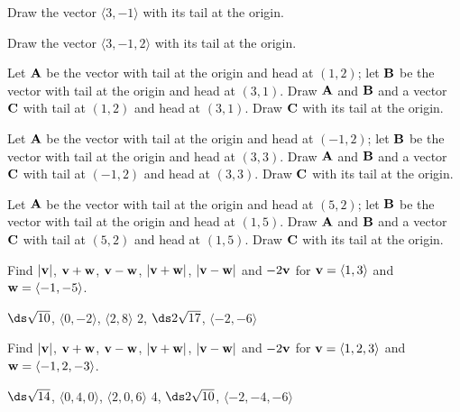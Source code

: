 \begin{enumialphparenastyle}

\begin{ex}
Draw the vector $\langle 3,-1\rangle$ with its tail at the
origin. 
\end{ex}

\begin{ex}
Draw the vector $\langle 3,-1,2\rangle$ with its tail at the
origin. 
\end{ex}

\begin{ex}
Let ${\bf A}$ be the vector with tail at the origin and head
at $(1,2)$; let ${\bf B}$ be the vector with tail at the origin and head
at $(3,1)$. Draw ${\bf A}$ and ${\bf B}$ and a vector ${\bf C}$ with 
tail at $(1,2)$ and head at $(3,1)$. Draw $\bf C$ with its tail at the origin.
\end{ex}

\begin{ex}
Let ${\bf A}$ be the vector with tail at the origin and head
at $(-1,2)$; let ${\bf B}$ be the vector with tail at the origin and head
at $(3,3)$. Draw ${\bf A}$ and ${\bf B}$ and a vector ${\bf C}$ with 
tail at $(-1,2)$ and head at $(3,3)$. Draw $\bf C$ with its tail at the origin.
\end{ex}

\begin{ex}
Let ${\bf A}$ be the vector with tail at the origin and head
at $(5,2)$; let ${\bf B}$ be the vector with tail at the origin and head
at $(1,5)$. Draw ${\bf A}$ and ${\bf B}$ and a vector ${\bf C}$ with 
tail at $(5,2)$ and head at $(1,5)$. Draw $\bf C$ with its tail at the origin.
\end{ex}

\begin{ex}
Find $|{\bf v}|$, ${\bf v}+{\bf w}$, ${\bf v}-{\bf w}$,
$|{\bf v}+{\bf w}|$, $|{\bf v}-{\bf w}|$ and $-2{\bf v}$ for
${\bf v} = \langle 1,3\rangle$ and ${\bf w} = \langle -1,-5\rangle$.
\begin{sol}
$\ds \sqrt{10}$, $\langle 0,-2\rangle$, $\langle 2,8\rangle$
2, $\ds 2\sqrt{17}$, $\langle -2,-6\rangle$
\end{sol}
\end{ex}

\begin{ex}
Find $|{\bf v}|$, ${\bf v}+{\bf w}$, ${\bf v}-{\bf w}$,
$|{\bf v}+{\bf w}|$, $|{\bf v}-{\bf w}|$ and $-2{\bf v}$ for
${\bf v} = \langle 1,2,3\rangle$ and ${\bf w} = \langle -1,2,-3\rangle$.
\begin{sol}
$\ds \sqrt{14}$, $\langle 0,4,0\rangle$, $\langle 2,0,6\rangle$
4, $\ds 2\sqrt{10}$, $\langle -2,-4,-6\rangle$
\end{sol}
\end{ex}


\end{enumialphparenastyle}

